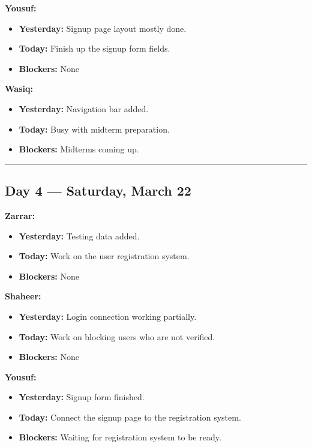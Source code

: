 \documentclass[12pt,a4paper]{article}
\begin{document}
\textbf{Yousuf:}
\begin{itemize}[noitemsep]
    \item \textbf{Yesterday:} Signup page layout mostly done.
    \item \textbf{Today:} Finish up the signup form fields.
    \item \textbf{Blockers:} None
\end{itemize}

\textbf{Wasiq:}
\begin{itemize}[noitemsep]
    \item \textbf{Yesterday:} Navigation bar added.
    \item \textbf{Today:} Busy with midterm preparation.
    \item \textbf{Blockers:} Midterms coming up.
\end{itemize}

\vspace{1em}
\hrule
\vspace{1em}

\subsection*{Day 4 --- Saturday, March 22}

\textbf{Zarrar:}
\begin{itemize}[noitemsep]
    \item \textbf{Yesterday:} Testing data added.
    \item \textbf{Today:} Work on the user registration system.
    \item \textbf{Blockers:} None
\end{itemize}

\textbf{Shaheer:}
\begin{itemize}[noitemsep]
    \item \textbf{Yesterday:} Login connection working partially.
    \item \textbf{Today:} Work on blocking users who are not verified.
    \item \textbf{Blockers:} None
\end{itemize}

\textbf{Yousuf:}
\begin{itemize}[noitemsep]
    \item \textbf{Yesterday:} Signup form finished.
    \item \textbf{Today:} Connect the signup page to the registration system.
    \item \textbf{Blockers:} Waiting for registration system to be ready.
\end{itemize}
\end{document}

